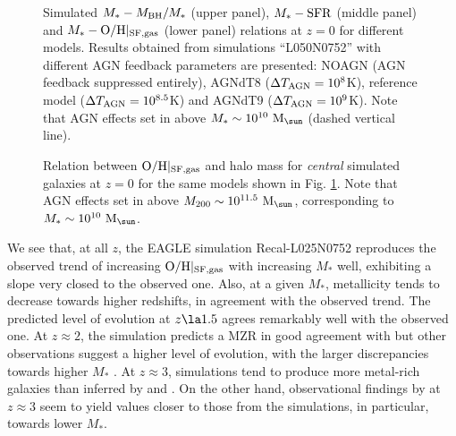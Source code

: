 \documentclass[useAMS,usenatbib]{mn2e}
\begin{document}
\begin{figure}
\begin{center}
\end{center}
\caption[]
{
Simulated 
$M_* - M_{\rm BH}/M_*$ (upper panel),
$M_* - {\rm SFR}$ (middle panel) and
$M_* - {\rm O/H}|_{\rm SF,gas}$ (lower panel)
relations at $z=0$ for different models. 
Results obtained from simulations 
``L050N0752'' with different AGN feedback parameters are presented:
NOAGN (AGN feedback suppressed entirely),
AGNdT8 ($\Delta T_{\rm AGN} = 10^{8}$K),
reference model ($\Delta T_{\rm AGN} = 10^{8.5}$K) and
AGNdT9 ($\Delta T_{\rm AGN} = 10^{9}$K).
Note that AGN effects set in above $M_* \sim 10^{10}\ {\rm M}_{\sun}$ (dashed vertical line).
}
\label{fig:mzr_agns1}
\end{figure}

\begin{figure}
\begin{center}
\end{center}
\caption[]
{
Relation between ${\rm O/H}|_{\rm SF,gas}$ and halo mass for {\em central}
simulated galaxies at $z=0$ for the same models shown in Fig. \ref{fig:mzr_agns1}.
Note that AGN effects set in above $M_{200} \sim 10^{11.5}\ {\rm M}_{\sun}$, corresponding
to $M_* \sim 10^{10}\ {\rm M}_{\sun}$. 
}
\label{fig:mzr_agns2}
\end{figure}

We see that, at all $z$, 
the {\sc EAGLE} simulation Recal-L025N0752 reproduces the observed trend of increasing 
${\rm O/H}|_{\rm SF,gas}$ with increasing $M_*$ well, 
exhibiting a slope very closed to the observed one. 
Also, at a given $M_*$, metallicity tends to decrease towards higher redshifts,
in agreement with the observed trend.  
The predicted level of evolution 
at $z \la 1.5$ agrees remarkably well with the observed one.
At $z \approx 2$, the simulation predicts a MZR in good agreement with
\citet{zahid2014} but other observations suggest a higher level of
evolution, with the larger discrepancies towards higher $M_*$
\citep[e.g.][]{hunt2016}.
At $z \approx 3$, simulations tend to produce more metal-rich galaxies than inferred by
\citet{maiolino2008} and \cite{onodera2016}. On the other hand, 
observational findings by \citet{hunt2016} at $z\approx 3$ seem to yield values closer to
those from the simulations, in particular, towards lower $M_*$.
\end{document}
